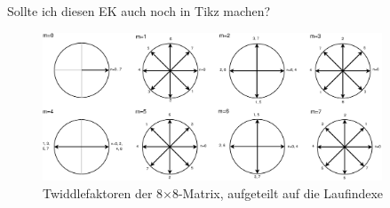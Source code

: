   

  Sollte ich diesen EK auch noch in Tikz machen?


\begin{figure}[!ht]
 \centering
 \includegraphics[width=0.9\textwidth]{img/Twiddlefaktoren_Einheitskreis.eps}
 \caption{Twiddlefaktoren der 8$\times$8-Matrix, aufgeteilt auf die Laufindexe}
 \label{pic:Twiddlefaktoren_Darstellung8x8}
\end{figure}

\vspace{0.5cm}


 

